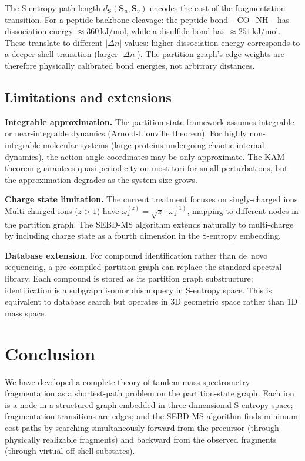 \documentclass[twocolumn,10pt,a4paper]{article}
\theoremstyle{thmstyle}
\theoremstyle{definition}
\theoremstyle{remark}
\newcommand{\Sv}{\mathbf{S}}
\begin{document}
The S-entropy path length $d_{\Sv}(\Sv_u, \Sv_v)$ encodes the cost
of the fragmentation transition. For a peptide backbone cleavage:
the peptide bond $-$CO$-$NH$-$ has dissociation energy
$\approx 360$\,kJ/mol, while a disulfide bond has
$\approx 251$\,kJ/mol. These translate to different $|\Delta n|$
values: higher dissociation energy corresponds to a deeper shell
transition (larger $|\Delta n|$). The partition graph's edge weights
are therefore physically calibrated bond energies, not arbitrary
distances.

\subsection{Limitations and extensions}

\textbf{Integrable approximation.} The partition state framework assumes
integrable or near-integrable dynamics (Arnold-Liouville theorem). For
highly non-integrable molecular systems (large proteins undergoing
chaotic internal dynamics), the action-angle coordinates may be only
approximate. The KAM theorem \citep{kolmogorov1954} guarantees
quasi-periodicity on most tori for small perturbations, but the
approximation degrades as the system size grows.

\textbf{Charge state limitation.} The current treatment focuses on
singly-charged ions. Multi-charged ions ($z > 1$) have
$\omega_z^{(z)} = \sqrt{z} \cdot \omega_z^{(1)}$, mapping to
different nodes in the partition graph. The SEBD-MS algorithm
extends naturally to multi-charge by including charge state as a
fourth dimension in the S-entropy embedding.

\textbf{Database extension.} For compound identification rather than
de~novo sequencing, a pre-compiled partition graph can replace the
standard spectral library. Each compound is stored as its partition
graph substructure; identification is a subgraph isomorphism query
in S-entropy space. This is equivalent to database search but operates
in 3D geometric space rather than 1D mass space.

\section{Conclusion}
\label{sec:conclusion}

We have developed a complete theory of tandem mass spectrometry
fragmentation as a shortest-path problem on the partition-state graph.
Each ion is a node in a structured graph embedded in three-dimensional
S-entropy space; fragmentation transitions are edges; and the SEBD-MS
algorithm finds minimum-cost paths by searching simultaneously forward
from the precursor (through physically realizable fragments) and backward
from the observed fragments (through virtual off-shell substates).
\end{document}
